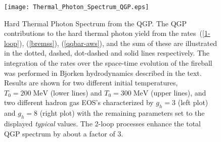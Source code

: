 \documentclass[12pt,twoside,fleqn]{article}
\newcommand{\figcaptionwidth}{15.cm}
\newcommand{\MeV}{\mbox{MeV}}
\begin{document}
\begin{figure}
  \texttt{[image: Thermal\_Photon\_Spectrum\_QGP.eps]}
  \parbox{\figcaptionwidth}{\caption[Hard Thermal Photon Spectrum from the QGP]
    {Hard Thermal Photon Spectrum from the QGP. The QGP contributions to the
      hard thermal photon yield from the rates~(\ref{1-loop}), (\ref{bremss}),
      (\ref{qqbar-aws}), and the sum of these are illustrated in the dotted,
      dashed, dot-dashed and solid lines respectively. The integration of the
      rates over the space-time evolution of the fireball was performed in
      Bjorken hydrodynamics described in the text. Results are shown for two
      different initial temperatures, $T_0 = 200\;\MeV$ (lower lines) and $T_0=
      300\;\MeV$ (upper lines), and two different hadron gas EOS's characterized
      by $g_h = 3$ (left plot) and $g_h = 8$ (right plot) with the remaining
      parameters set to the displayed {\em typical} values. The 2-loop processes
      enhance the total QGP spectrum by about a factor of 3.}}
\label{Fig_thermal_photon_spectrum_QGP}
\end{figure} 
%
%
\end{document}
